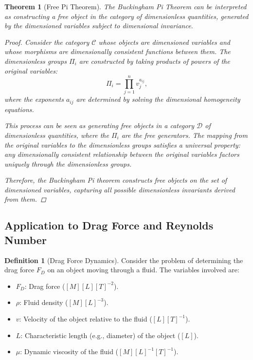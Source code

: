 \documentclass{article}
\newtheorem{theorem}{Theorem}[section]
\theoremstyle{definition}
\newtheorem{definition}{Definition}[section]
\theoremstyle{remark}
\begin{document}
	\begin{theorem}[Free Pi Theorem]
		The Buckingham Pi Theorem can be interpreted as constructing a free object in the category of dimensionless quantities, generated by the dimensioned variables subject to dimensional invariance.
		
		\begin{proof}
			Consider the category $\mathcal{C}$ whose objects are dimensioned variables and whose morphisms are dimensionally consistent functions between them. The dimensionless groups $\Pi_i$ are constructed by taking products of powers of the original variables:
			\[
			\Pi_i = \prod_{j=1}^n v_j^{a_{ij}},
			\]
			where the exponents $a_{ij}$ are determined by solving the dimensional homogeneity equations.
			
			This process can be seen as generating free objects in a category $\mathcal{D}$ of dimensionless quantities, where the $\Pi_i$ are the free generators. The mapping from the original variables to the dimensionless groups satisfies a universal property: any dimensionally consistent relationship between the original variables factors uniquely through the dimensionless groups.
			
			Therefore, the Buckingham Pi theorem constructs free objects on the set of dimensioned variables, capturing all possible dimensionless invariants derived from them.
		\end{proof}
	\end{theorem}
	
	\subsection{Application to Drag Force and Reynolds Number}
	
	\begin{definition}[Drag Force Dynamics]
		Consider the problem of determining the drag force $F_D$ on an object moving through a fluid. The variables involved are:
		\begin{itemize}
			\item $F_D$: Drag force ($[M][L][T]^{-2}$).
			\item $\rho$: Fluid density ($[M][L]^{-3}$).
			\item $v$: Velocity of the object relative to the fluid ($[L][T]^{-1}$).
			\item $L$: Characteristic length (e.g., diameter) of the object ($[L]$).
			\item $\mu$: Dynamic viscosity of the fluid ($[M][L]^{-1}[T]^{-1}$).
		\end{itemize}
	\end{definition}
	
\end{document}
